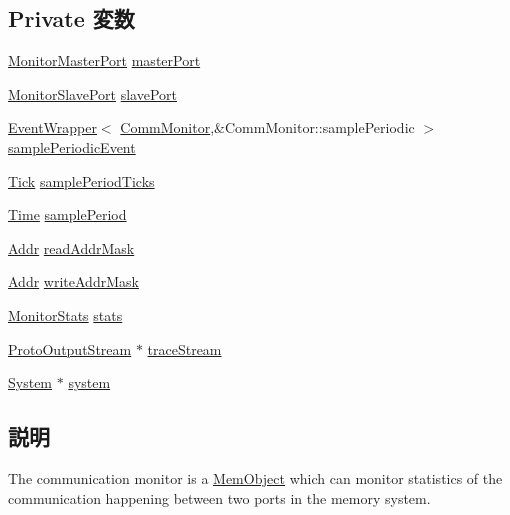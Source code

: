 \subsection*{Private 変数}
\begin{DoxyCompactItemize}
\item 
\hyperlink{classCommMonitor_1_1MonitorMasterPort}{MonitorMasterPort} \hyperlink{classCommMonitor_a2eb439e94fc831a4b07a2e5d4268a365}{masterPort}
\item 
\hyperlink{classCommMonitor_1_1MonitorSlavePort}{MonitorSlavePort} \hyperlink{classCommMonitor_a3a2b0c2e0b88fa0a90bf89c0d7e6809e}{slavePort}
\item 
\hyperlink{classEventWrapper}{EventWrapper}$<$ \hyperlink{classCommMonitor_1_1CommMonitor}{CommMonitor},\&CommMonitor::samplePeriodic $>$ \hyperlink{classCommMonitor_a59f6dafc1b1b5cf7eda2e4a47a47c515}{samplePeriodicEvent}
\item 
\hyperlink{base_2types_8hh_a5c8ed81b7d238c9083e1037ba6d61643}{Tick} \hyperlink{classCommMonitor_a087522d1bccfcac06ee7396d5da731e9}{samplePeriodTicks}
\item 
\hyperlink{classTime}{Time} \hyperlink{classCommMonitor_a2b79d72692e74b1c084ea31e63c5cf55}{samplePeriod}
\item 
\hyperlink{base_2types_8hh_af1bb03d6a4ee096394a6749f0a169232}{Addr} \hyperlink{classCommMonitor_abf0db97222382e11cb1264c6709629b3}{readAddrMask}
\item 
\hyperlink{base_2types_8hh_af1bb03d6a4ee096394a6749f0a169232}{Addr} \hyperlink{classCommMonitor_aed61db18cf47a6b2d34ba6179dd19b40}{writeAddrMask}
\item 
\hyperlink{structCommMonitor_1_1MonitorStats}{MonitorStats} \hyperlink{classCommMonitor_a271fb3be9460a6727cb088bba7fde65e}{stats}
\item 
\hyperlink{classProtoOutputStream}{ProtoOutputStream} $\ast$ \hyperlink{classCommMonitor_afcb6a80c2432e45a3730484625ee1d20}{traceStream}
\item 
\hyperlink{classSystem}{System} $\ast$ \hyperlink{classCommMonitor_af27ccd765f13a4b7bd119dc7579e2746}{system}
\end{DoxyCompactItemize}


\subsection{説明}
The communication monitor is a \hyperlink{classMemObject}{MemObject} which can monitor statistics of the communication happening between two ports in the memory system.

